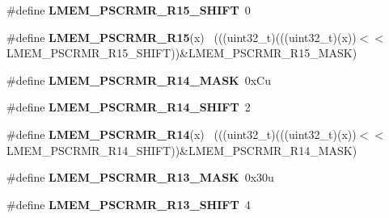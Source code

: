 \begin{DoxyCompactItemize}
\item 
\hypertarget{group___l_m_e_m___register___masks_ga20aebfbf7b8b9f5c753c4216910e92c2}{}\#define {\bfseries L\+M\+E\+M\+\_\+\+P\+S\+C\+R\+M\+R\+\_\+\+R15\+\_\+\+S\+H\+I\+F\+T}~0\label{group___l_m_e_m___register___masks_ga20aebfbf7b8b9f5c753c4216910e92c2}

\item 
\hypertarget{group___l_m_e_m___register___masks_ga90e9fa9e8995c6fc493a80303efb8935}{}\#define {\bfseries L\+M\+E\+M\+\_\+\+P\+S\+C\+R\+M\+R\+\_\+\+R15}(x)                                          ~(((uint32\+\_\+t)(((uint32\+\_\+t)(x))$<$$<$L\+M\+E\+M\+\_\+\+P\+S\+C\+R\+M\+R\+\_\+\+R15\+\_\+\+S\+H\+I\+F\+T))\&L\+M\+E\+M\+\_\+\+P\+S\+C\+R\+M\+R\+\_\+\+R15\+\_\+\+M\+A\+S\+K)\label{group___l_m_e_m___register___masks_ga90e9fa9e8995c6fc493a80303efb8935}

\item 
\hypertarget{group___l_m_e_m___register___masks_gad009306b2607aa25a010a80e0475c73d}{}\#define {\bfseries L\+M\+E\+M\+\_\+\+P\+S\+C\+R\+M\+R\+\_\+\+R14\+\_\+\+M\+A\+S\+K}~0x\+Cu\label{group___l_m_e_m___register___masks_gad009306b2607aa25a010a80e0475c73d}

\item 
\hypertarget{group___l_m_e_m___register___masks_ga40e2be3de5c61122ce2ddff7eee8e3ed}{}\#define {\bfseries L\+M\+E\+M\+\_\+\+P\+S\+C\+R\+M\+R\+\_\+\+R14\+\_\+\+S\+H\+I\+F\+T}~2\label{group___l_m_e_m___register___masks_ga40e2be3de5c61122ce2ddff7eee8e3ed}

\item 
\hypertarget{group___l_m_e_m___register___masks_gae0ad68fbd11f7c8b8d4de3c76e59b01d}{}\#define {\bfseries L\+M\+E\+M\+\_\+\+P\+S\+C\+R\+M\+R\+\_\+\+R14}(x)                                          ~(((uint32\+\_\+t)(((uint32\+\_\+t)(x))$<$$<$L\+M\+E\+M\+\_\+\+P\+S\+C\+R\+M\+R\+\_\+\+R14\+\_\+\+S\+H\+I\+F\+T))\&L\+M\+E\+M\+\_\+\+P\+S\+C\+R\+M\+R\+\_\+\+R14\+\_\+\+M\+A\+S\+K)\label{group___l_m_e_m___register___masks_gae0ad68fbd11f7c8b8d4de3c76e59b01d}

\item 
\hypertarget{group___l_m_e_m___register___masks_gaf547ffdaf00a063a09ac014baa9755da}{}\#define {\bfseries L\+M\+E\+M\+\_\+\+P\+S\+C\+R\+M\+R\+\_\+\+R13\+\_\+\+M\+A\+S\+K}~0x30u\label{group___l_m_e_m___register___masks_gaf547ffdaf00a063a09ac014baa9755da}

\item 
\hypertarget{group___l_m_e_m___register___masks_gabb30cdfe6d1de0029ad8286c441fd79d}{}\#define {\bfseries L\+M\+E\+M\+\_\+\+P\+S\+C\+R\+M\+R\+\_\+\+R13\+\_\+\+S\+H\+I\+F\+T}~4\label{group___l_m_e_m___register___masks_gabb30cdfe6d1de0029ad8286c441fd79d}


\end{DoxyCompactItemize}
